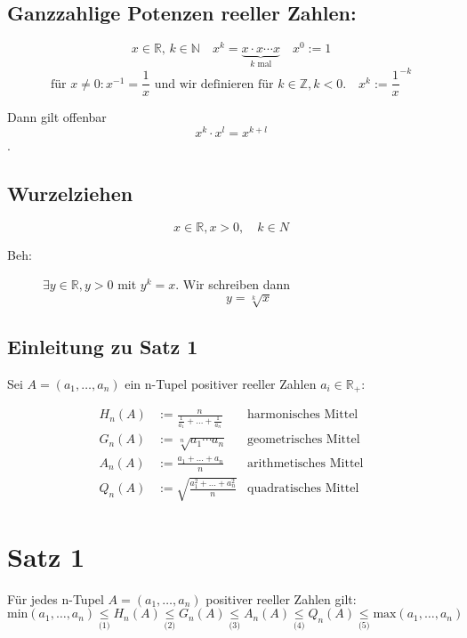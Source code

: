 \documentclass[12pt,a4paper,leqno]{article}
\begin{document}
  
  \subsection*{Ganzzahlige Potenzen reeller Zahlen:}
  $$x \in \mathbb{R} \textrm{, } k \in \mathbb{N} \quad x^k = \underbrace{x  \cdot  x  \cdots  x}_{k \textrm{ mal}} \quad x^0 := 1$$
  $$\textrm{für } x \neq 0 : x^{-1} = \frac{1}{x} \textrm{ und wir definieren für } k \in \mathbb{Z}, k < 0. \quad x ^{k} := \frac{1}{x} ^{-k}$$
  
  Dann gilt offenbar $$x^k  \cdot  x ^l = x ^{k+l}$$.
  \subsection*{Wurzelziehen}
  
  $$x \in \mathbb{R}, x > 0,\quad k \in N$$
  
  \begin{description}
    \item[Beh:] $∃y \in \mathbb{R}, y > 0$ mit $y ^ k = x$. Wir schreiben dann 
       $$y = \sqrt[k]{x}$$
  \end{description}
  
  \subsection*{Einleitung zu Satz 1}  
  
  Sei $A=(a_1,\dotsc, a_n)$ ein n-Tupel positiver reeller Zahlen $a_i \in \mathbb{R}_+$:
  
  \begin{align*}
    H_n(A) &:= \frac{n}{\frac{1}{a_1} + ... + \frac{1}{a_n}} & \textrm{harmonisches Mittel} \\
    G_n(A) &:= \sqrt[n]{a_1 \cdots a_n} & \textrm{geometrisches Mittel}\\
    A_n(A) &:= \frac{a_1 + ... + a_n}{n}  & \textrm{arithmetisches Mittel}\\
    Q_n(A) &:= \sqrt{\frac{a_1^2 + ... + a_n^2}{n}} & \textrm{quadratisches  Mittel}
  \end{align*}
  
  \section*{Satz 1}
  
  Für jedes n-Tupel $A=(a_1,\dotsc, a_n)$ positiver reeller Zahlen gilt:
  $$\textrm{min}(a_1,\dotsc, a_n) \underset{\textrm{(1)}}{\leq} 
  H_n(A) \underset{\textrm{(2)}}{\leq} 
  G_n(A) \underset{\textrm{(3)}}{\leq} 
  A_n(A) \underset{\textrm{(4)}}{\leq} 
  Q_n(A) \underset{\textrm{(5)}}{\leq} 
  \textrm{max}(a_1,\dotsc, a_n)$$
  
\end{document}
